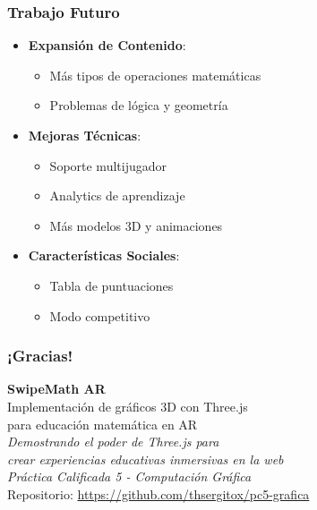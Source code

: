 \documentclass{beamer}
\begin{document}
\begin{frame}
\frametitle{Trabajo Futuro}
\begin{itemize}
    \item<1-> \textbf{Expansión de Contenido}:
    \begin{itemize}
        \item<2-> Más tipos de operaciones matemáticas
        \item<3-> Problemas de lógica y geometría
    \end{itemize}
    \item<4-> \textbf{Mejoras Técnicas}:
    \begin{itemize}
        \item<5-> Soporte multijugador
        \item<6-> Analytics de aprendizaje
        \item<7-> Más modelos 3D y animaciones
    \end{itemize}
    \item<8-> \textbf{Características Sociales}:
    \begin{itemize}
        \item<9-> Tabla de puntuaciones
        \item<10-> Modo competitivo
    \end{itemize}
\end{itemize}
\end{frame}

\begin{frame}
\frametitle{¡Gracias!}
\begin{center}
\Large
\textbf{SwipeMath AR}\\
\vspace{0.5cm}
\normalsize
Implementación de gráficos 3D con Three.js\\
para educación matemática en AR\\
\vspace{0.5cm}
\small
\textit{Demostrando el poder de Three.js para}\\
\textit{crear experiencias educativas inmersivas en la web}\\
\vspace{0.5cm}
\textit{Práctica Calificada 5 - Computación Gráfica}\\
\vspace{0.3cm}
\footnotesize
Repositorio: \url{https://github.com/thsergitox/pc5-grafica}
\end{center}
\end{frame}
\end{document}
